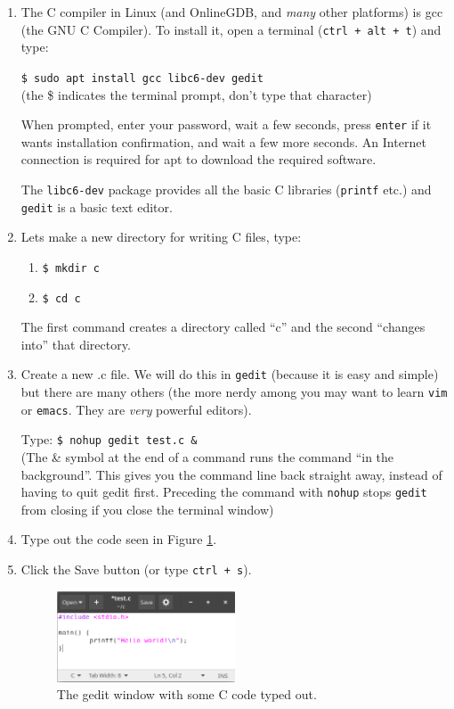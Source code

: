 \documentclass{lab}
\begin{document}
\begin{enumerate}
\item The C compiler in Linux (and OnlineGDB, and \textit{many} other platforms) is gcc (the GNU C Compiler). To install it, open a terminal (\texttt{ctrl + alt + t}) and type:

\texttt{\$ sudo apt install gcc libc6-dev gedit}\\ (the \$ indicates the terminal prompt, don't type that character)

When prompted, enter your password, wait a few seconds, press \texttt{enter} if it wants installation confirmation, and wait a few more seconds. An Internet connection is required for apt to download the required software.

The \texttt{libc6-dev} package provides all the basic C libraries (\texttt{printf} etc.) and \texttt{gedit} is a basic text editor.

\item Lets make a new directory for writing C files, type:
\begin{enumerate}
	\item \texttt{\$ mkdir c}
	\item \texttt{\$ cd c}
\end{enumerate}
The first command creates a directory called ``c'' and the second ``changes into'' that directory.

\item Create a new .c file. We will do this in \texttt{gedit} (because it is easy and simple) but there are many others (the more nerdy among you may want to learn \texttt{vim} or \texttt{emacs}. They are \textit{very} powerful editors).

Type: \texttt{\$ nohup gedit test.c \&} \\ (The \& symbol at the end of a command runs the command ``in the background''. This gives you the command line back straight away, instead of having to quit gedit first. Preceding the command with \texttt{nohup} stops \texttt{gedit} from closing if you close the terminal window)

\item Type out the code seen in Figure \ref{fig:gedit}.

\item Click the Save button (or type \texttt{ctrl + s}).

\begin{figure}[H]
\begin{center}
\includegraphics[width=0.5\textwidth]{gedit.png}
\end{center}
\caption{The gedit window with some C code typed out.}\label{fig:gedit}
\end{figure}


\end{enumerate}
\end{document}
